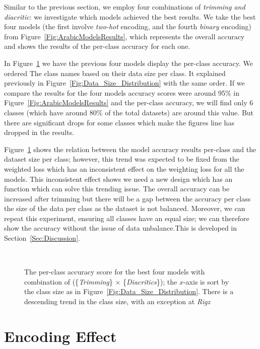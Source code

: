 Similar to the previous section, we employ four combinations of \textit{trimming and diacritic}: we investigate which models achieved the best results. We take the best four models (the first involve \textit{two-hot} encoding, and the fourth \textit{binary} encoding) from Figure~\ref{Fig:ArabicModelsResults}, which represents the overall accuracy and shows the results of the per-class accuracy for each one.

In Figure~\ref{Fig:Results_Per_Class} we have the previous four models display the per-class accuracy. We ordered The class names based on their data size per class. It explained previously in Figure~\ref{Fig:Data_Size_Distribution} with the same order. If we compare the results for the four models accuracy scores were around 95\% in Figure~\ref{Fig:ArabicModelsResults} and the per-class accuracy, we will find only 6 classes (which have around 80\% of the total datasets) are around this value. But there are significant drops for some classes which make the figures line has dropped in the results.


Figure~\ref{Fig:Results_Per_Class} shows the relation between the model accuracy results per-class and the dataset size per class; however, this trend was expected to be fixed from the weighted loss which has an inconsistent effect on the weighting loss for all the models. This inconsistent effect shows we need a new design which has an function which can solve this trending issue. The overall accuracy can be increased after trimming but there will be a gap between the accuracy per class the size of the data per class as the dataset is not balanced. Moreover, we can repeat this experiment, ensuring all classes have an equal size; we can therefore show the accuracy without the issue of data unbalance.This is developed in Section~\ref{Sec:Discussion}.


\begin{figure}[!t]
 
 \caption{The per-class accuracy score for the best four models with combination of (\{\textit{Trimming}\} $\times$ \{\textit{Diacritics}\}); the $x$-axis is sort by the class size as in Figure~\ref{Fig:Data_Size_Distribution}. There is a descending trend in the class size, with an exception at \textit{Rigz}}~\label{Fig:Results_Per_Class}
\end{figure}

\section{Encoding Effect}


